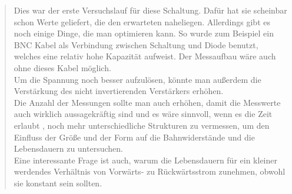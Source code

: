 \begin{quote}
     Dies war der erste Versuchslauf für diese Schaltung. Dafür hat sie
     scheinbar schon Werte geliefert, die den erwarteten naheliegen. Allerdings
     gibt es noch einige Dinge, die man optimieren kann. So wurde zum Beispiel
     ein BNC Kabel als Verbindung zwischen Schaltung und Diode benutzt, welches
     eine relativ hohe Kapazität aufweist. Der Messaufbau wäre auch ohne dieses
     Kabel möglich.\\
     Um die Spannung noch besser aufzulösen, könnte man außerdem die
     Verstärkung des nicht invertierenden Verstärkers erhöhen.\\
     Die Anzahl der Messungen sollte man auch erhöhen, damit die Messwerte auch
     wirklich aussagekräftig sind und es wäre sinnvoll, wenn es die Zeit erlaubt
     , noch mehr unterschiedliche Strukturen zu vermessen, um den Einfluss der
     Größe und der Form auf die Bahnwiderstände und die Lebensdauern zu
     untersuchen.\\
     Eine interessante Frage ist auch, warum die Lebensdauern für ein kleiner
     werdendes Verhältnis von Vorwärts- zu Rückwärtsstrom zunehmen, obwohl sie
     konstant sein sollten.



\end{quote} %


\newpage

